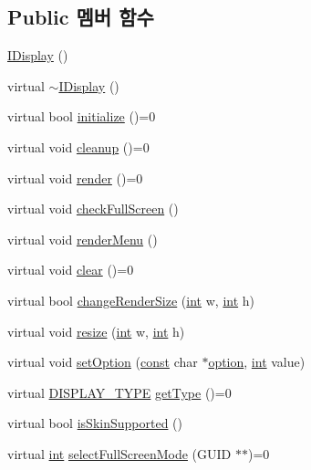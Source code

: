 \subsection*{Public 멤버 함수}
\begin{DoxyCompactItemize}
\item 
\mbox{\hyperlink{class_i_display_a97aa6c259f01df9a808ba12381bb496e}{I\+Display}} ()
\item 
virtual \mbox{\hyperlink{class_i_display_a1565628adf40731374c6ea2c76afb1fb}{$\sim$\+I\+Display}} ()
\item 
virtual bool \mbox{\hyperlink{class_i_display_aa849b5d829138d08cf9efdbb00364a96}{initialize}} ()=0
\item 
virtual void \mbox{\hyperlink{class_i_display_a039e8c6b3f8fbee485fb895ef70e72c0}{cleanup}} ()=0
\item 
virtual void \mbox{\hyperlink{class_i_display_af61c440b97da313a502e86346a729b03}{render}} ()=0
\item 
virtual void \mbox{\hyperlink{class_i_display_afcb9df4a4949d13491f9a07a2ce24eb0}{check\+Full\+Screen}} ()
\item 
virtual void \mbox{\hyperlink{class_i_display_ad6fc199a615635440ca01485c1283d41}{render\+Menu}} ()
\item 
virtual void \mbox{\hyperlink{class_i_display_affb8a8b5651d138058cdbd088ff3968d}{clear}} ()=0
\item 
virtual bool \mbox{\hyperlink{class_i_display_ab6e4355da026afb85710ae3e12329176}{change\+Render\+Size}} (\mbox{\hyperlink{_util_8cpp_a0ef32aa8672df19503a49fab2d0c8071}{int}} w, \mbox{\hyperlink{_util_8cpp_a0ef32aa8672df19503a49fab2d0c8071}{int}} h)
\item 
virtual void \mbox{\hyperlink{class_i_display_ad0b4ba99f59edd7a6857e3b3941b3ba2}{resize}} (\mbox{\hyperlink{_util_8cpp_a0ef32aa8672df19503a49fab2d0c8071}{int}} w, \mbox{\hyperlink{_util_8cpp_a0ef32aa8672df19503a49fab2d0c8071}{int}} h)
\item 
virtual void \mbox{\hyperlink{class_i_display_a1766244708c252bb8781892c76c20ba9}{set\+Option}} (\mbox{\hyperlink{getopt1_8c_a2c212835823e3c54a8ab6d95c652660e}{const}} char $\ast$\mbox{\hyperlink{structoption}{option}}, \mbox{\hyperlink{_util_8cpp_a0ef32aa8672df19503a49fab2d0c8071}{int}} value)
\item 
virtual \mbox{\hyperlink{_display_8h_aa50f63b0688d0250e0be64d8401d09a0}{D\+I\+S\+P\+L\+A\+Y\+\_\+\+T\+Y\+PE}} \mbox{\hyperlink{class_i_display_a2c7fd4c6721dd8a6992b78f0c588f6f9}{get\+Type}} ()=0
\item 
virtual bool \mbox{\hyperlink{class_i_display_ad717007b624f0a8e7c830ab803cd8a92}{is\+Skin\+Supported}} ()
\item 
virtual \mbox{\hyperlink{_util_8cpp_a0ef32aa8672df19503a49fab2d0c8071}{int}} \mbox{\hyperlink{class_i_display_a2f7a55f63c5e4b24245aa88228afab68}{select\+Full\+Screen\+Mode}} (G\+U\+ID $\ast$$\ast$)=0
\end{DoxyCompactItemize}


